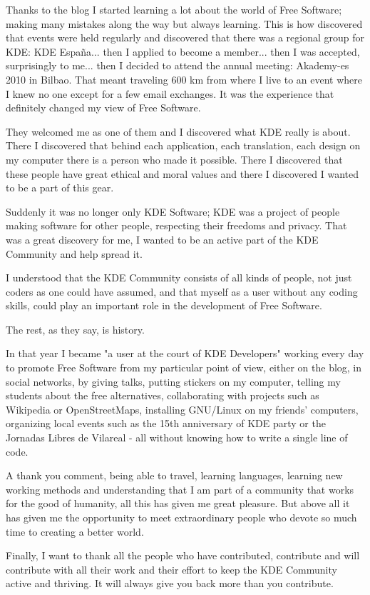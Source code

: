 Thanks to the blog I started learning a lot about the world of Free Software; making many mistakes along the way but always learning.
This is how discovered that events were held regularly and discovered that there was a regional group for KDE: KDE Espa\~na... then I applied to become a member... then I was accepted, surprisingly to me... then I decided to attend the annual meeting: Akademy-es 2010 in Bilbao. That meant traveling 600 km from where I live to an event where I knew no one except for a few email exchanges. It was the experience that definitely changed my view of Free Software.

They welcomed me as one of them and I discovered what KDE really is about. There I discovered that behind each application, each translation, each design on my computer there is a person who made it possible. There I discovered that these people have great ethical and moral values and there I discovered I wanted to be a part of this gear.

Suddenly it was no longer only KDE Software; KDE was a project of people making software for other people, respecting their freedoms and privacy. That was a great discovery for me, I wanted to be an active part of the KDE Community and help spread it.

I understood that the KDE Community consists of all kinds of people, not just coders as one could have assumed, and that myself as a user without any coding skills, could play an important role in the development of Free Software.

The rest, as they say, is history.

In that year I became "a user at the court of KDE Developers" working every day to promote Free Software from my particular point of view, either on the blog, in social networks, by giving talks, putting stickers on my computer, telling my students about the free alternatives, collaborating with projects such as Wikipedia or OpenStreetMaps, installing GNU/Linux on my friends' computers, organizing local events such as the 15th anniversary of KDE party or the Jornadas Libres de Vilareal - all without knowing how to write a single line of code.

A thank you comment, being able to travel, learning languages, learning new working methods and understanding that I am part of a community that works for the good of humanity, all this has given me great pleasure. But above all it has given me the opportunity to meet extraordinary people who devote so much time to creating a better world.

Finally, I want to thank all the people who have contributed, contribute and will contribute with all their work and their effort to keep the KDE Community active and thriving. It will always give you back more than you contribute.
